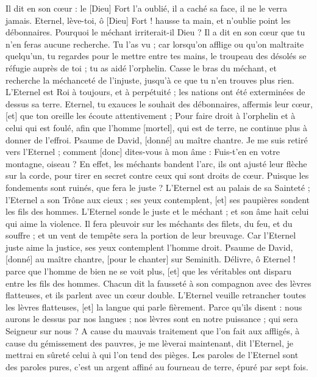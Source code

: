 \begin{multicols}{2}
Il dit en son cœur : le [Dieu] Fort l'a oublié, il a caché sa face, il ne le verra jamais.
Eternel, lève-toi, ô [Dieu] Fort ! hausse ta main, et n'oublie point les débonnaires.
Pourquoi le méchant irriterait-il Dieu ? Il a dit en son cœur que tu n'en feras aucune recherche.
Tu l'as vu ; car lorsqu'on afflige ou qu'on maltraite quelqu'un, tu regardes pour le mettre entre tes mains, le troupeau des désolés se réfugie auprès de toi ; tu as aidé l'orphelin.
Casse le bras du méchant, et recherche la méchanceté de l'injuste, jusqu'à ce que tu n'en trouves plus rien.
L'Eternel est Roi à toujours, et à perpétuité ; les nations ont été exterminées de dessus sa terre.
Eternel, tu exauces le souhait des débonnaires, affermis leur cœur, [et] que ton oreille les écoute attentivement ;
Pour faire droit à l'orphelin et à celui qui est foulé, afin que l'homme [mortel], qui est de terre, ne continue plus à donner de l'effroi.
\VerseOne{}Psaume de David, [donné] au maître chantre. Je me suis retiré vers l'Eternel ; comment [donc] dites-vous à mon âme : Fuis-t'en en votre montagne, oiseau ?
En effet, les méchants bandent l'arc, ils ont ajusté leur flèche sur la corde, pour tirer en secret contre ceux qui sont droits de cœur.
Puisque les fondements sont ruinés, que fera le juste ?
L'Eternel est au palais de sa Sainteté ; l'Eternel a son Trône aux cieux ; ses yeux contemplent, [et] ses paupières sondent les fils des hommes.
L'Eternel sonde le juste et le méchant ; et son âme hait celui qui aime la violence.
Il fera pleuvoir sur les méchants des filets, du feu, et du souffre ; et un vent de tempête sera la portion de leur breuvage.
Car l'Eternel juste aime la justice, ses yeux contemplent l'homme droit.
\VerseOne{}Psaume de David, [donné] au maître chantre, [pour le chanter] sur Seminith. Délivre, ô Eternel ! parce que l'homme de bien ne se voit plus, [et] que les véritables ont disparu entre les fils des hommes.
Chacun dit la fausseté à son compagnon avec des lèvres flatteuses, et ils parlent avec un cœur double.
L'Eternel veuille retrancher toutes les lèvres flatteuses, [et] la langue qui parle fièrement.
Parce qu'ils disent : nous aurons le dessus par nos langues ; nos lèvres sont en notre puissance ; qui sera Seigneur sur nous ?
A cause du mauvais traitement que l'on fait aux affligés, à cause du gémissement des pauvres, je me lèverai maintenant, dit l'Eternel, je mettrai en sûreté celui à qui l'on tend des pièges.
Les paroles de l'Eternel sont des paroles pures, c'est un argent affiné au fourneau de terre, épuré par sept fois.

\end{multicols}
